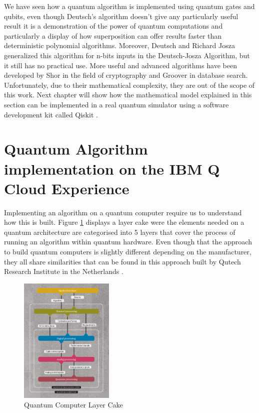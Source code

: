\documentclass[12pt,a4paper]{scrartcl}
\begin{document}
We have seen how a quantum algorithm is implemented using quantum gates and qubits, even though Deutsch's algorithm doesn't give any particularly useful result it is a demonstration of the power of quantum computations and particularly a display of how superposition can offer results faster than deterministic polynomial algorithms. Moreover, Deutsch and Richard Josza generalized this algorithm for n-bits inputs in the Deutsch-Josza Algorithm, but it still has no practical use. More useful and advanced algorithms have been developed by Shor \cite{Shor1994} in the field of cryptography and Groover \cite{Grover1996} in database search. Unfortunately, due to their mathematical complexity, they are out of the scope of this work. Next chapter will show how the mathematical model explained in this section can be implemented in a real quantum simulator using a software development kit called Qiskit \cite{qiskit}. 

\section{Quantum Algorithm implementation on the IBM Q Cloud Experience}

Implementing an algorithm on a quantum computer require us to understand how this is built. Figure \ref{fig:qc-layers} displays a layer cake were the elements needed on a quantum architecture are categorised into 5 layers that cover the process of running an algorithm within quantum hardware. Even though that the approach to build quantum computers is slightly different depending on the manufacturer, they all share similarities that can be found in this approach built by Qutech Research Institute in the Netherlands \cite{versluis2020}. 

\begin{figure}[H]
    \centering
    \includegraphics[width=0.4\textwidth]{./images/3-quantum_computing_layers}
    \caption{Quantum Computer Layer Cake \cite{versluis2020}}
    \label{fig:qc-layers}
\end{figure}
\end{document}
